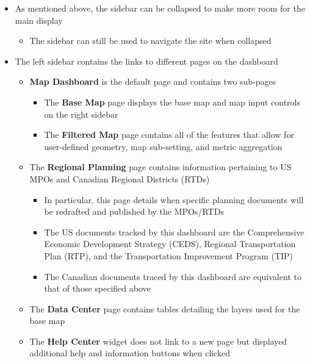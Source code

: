 \documentclass[
]{article}
\providecommand{\tightlist}{%
  \setlength{\itemsep}{0pt}\setlength{\parskip}{0pt}}
\begin{document}
\begin{itemize}
\tightlist
\item
  As mentioned above, the sidebar can be collapsed to make more room for
  the main display

  \begin{itemize}
  \tightlist
  \item
    The sidebar can still be used to navigate the site when collapsed
  \end{itemize}
\item
  The left sidebar contains the links to different pages on the
  dashboard

  \begin{itemize}
  \tightlist
  \item
    \textbf{Map Dashboard} is the default page and contains two
    sub-pages

    \begin{itemize}
    \tightlist
    \item
      The \textbf{Base Map} page displays the base map and map input
      controls on the right sidebar
    \item
      The \textbf{Filtered Map} page contains all of the features that
      allow for user-defined geometry, map sub-setting, and metric
      aggregation
    \end{itemize}
  \item
    The \textbf{Regional Planning} page contains information pertaining
    to US MPOs and Canadian Regional Districts (RTDs)

    \begin{itemize}
    \tightlist
    \item
      In particular, this page details when specific planning documents
      will be redrafted and published by the MPOs/RTDs
    \item
      The US documents tracked by this dashboard are the Comprehensive
      Economic Development Strategy (CEDS), Regional Transportation Plan
      (RTP), and the Transportation Improvement Program (TIP)
    \item
      The Canadian documents traced by this dashboard are equivalent to
      that of those specified above
    \end{itemize}
  \item
    The \textbf{Data Center} page contains tables detailing the layers
    used for the base map
  \item
    The \textbf{Help Center} widget does not link to a new page but
    displayed additional help and information buttons when clicked
  \end{itemize}
\end{itemize}
\end{document}
